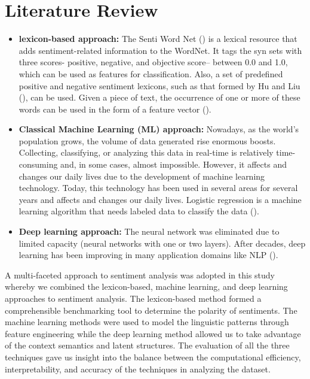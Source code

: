 \documentclass[twoside]{article}
\begin{document}
\section{Literature Review}
\begin{itemize}[label=\textbullet]
	\item \textbf{lexicon-based approach:} 
	The Senti Word Net (\cite{Esuli:2006}) is a lexical resource that adds sentiment-related information to the WordNet. It tags the syn sets with three scores- positive, negative, and objective score– between 0.0 and 1.0, which can be used as features for classification. Also, a set of predefined positive and negative sentiment lexicons, such as that formed by Hu and Liu (\cite{Hu and Liu:2004}), can be used. Given a piece of text, the occurrence of one or more of these words can be used in the form of a feature vector (\cite{Singhal:2016}). 
	\item \textbf{Classical Machine Learning (ML) approach: }
	Nowadays, as the world’s population grows, the volume of data generated rise enormous boosts. Collecting, classifying, or analyzing this data in real-time is relatively time-consuming and, in some cases, almost impossible. However, it affects and changes our daily lives due to the development of machine learning technology. Today, this technology has been used in several areas for several years and affects and changes our daily lives. Logistic regression is a machine learning algorithm that needs labeled data to classify the data (\cite{Turcanik:1998}).
	\item \textbf{Deep learning approach:}
	The neural network was eliminated due to limited capacity (neural networks with one or two layers). After decades, deep learning has been improving in many application domains like NLP (\cite{Zhang:2018}).
	
\end{itemize}
A multi-faceted approach to sentiment analysis was adopted in this study whereby we combined the lexicon-based, machine learning, and deep learning approaches to sentiment analysis. The lexicon-based method formed a comprehensible benchmarking tool to determine the polarity of sentiments. The machine learning methods were used to model the linguistic patterns through feature engineering while the deep learning method allowed us to take advantage of the context semantics and latent structures. The evaluation of all the three techniques gave us insight into the balance between the computational efficiency, interpretability, and accuracy of the techniques in analyzing the dataset.
\end{document}
